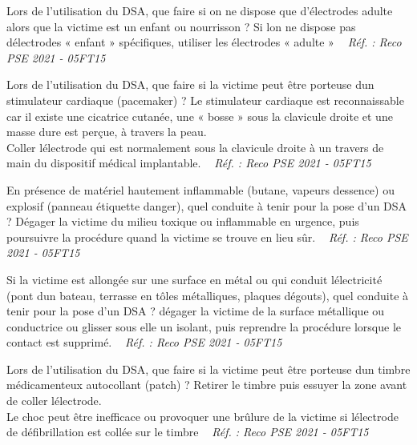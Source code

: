 \documentclass[grid,avery5371,landscape]{flashcards}
\makeatletter
\newcounter{nocarte}
\newcommand{\categ}[1]{%
  \def\@categ{#1}%
  \setcounter{nocarte}{0}%
}
\newcommand{\source}[1]{%
  \medskip
  \itshape%
   ~ \hfill Réf. : #1}
\makeatother
\begin{document}
\color[HTML]{003273}
\categ{PSE}
\begin{flashcard}[CAT]{
 Lors de l'utilisation du DSA, que faire si on ne dispose que d'électrodes adulte alors que la victime est un enfant ou nourrisson ?   }
  Si lon ne dispose pas délectrodes « enfant » spécifiques, utiliser les électrodes « adulte »
  \source{Reco PSE 2021 - 05FT15}
\end{flashcard}


\color[HTML]{003273}
\categ{PSE}
\begin{flashcard}[CAT]{
 Lors de l'utilisation du DSA, que faire si la victime peut être porteuse dun stimulateur cardiaque (pacemaker) ?   }
  Le stimulateur cardiaque est reconnaissable car il existe une cicatrice cutanée, une « bosse » sous la clavicule droite et une masse dure est perçue, à travers la peau. \\ Coller lélectrode qui est normalement sous la clavicule droite à un travers de main du dispositif médical implantable.
  \source{Reco PSE 2021 - 05FT15}
\end{flashcard}


\color[HTML]{003273}
\categ{PSE}
\begin{flashcard}[CAT]{
 En présence de matériel hautement inflammable (butane, vapeurs dessence) ou explosif (panneau étiquette danger), quel conduite à tenir pour la pose d'un DSA ?   }
  Dégager la victime du milieu toxique ou inflammable en urgence, puis poursuivre la procédure quand la victime se trouve en lieu sûr.
  \source{Reco PSE 2021 - 05FT15}
\end{flashcard}


\color[HTML]{003273}
\categ{PSE}
\begin{flashcard}[CAT]{
 Si la victime est allongée sur une surface en métal ou qui conduit lélectricité (pont dun bateau, terrasse en tôles métalliques, plaques dégouts), quel conduite à tenir pour la pose d'un DSA ?   }
  dégager la victime de la surface métallique ou conductrice ou glisser sous elle un isolant, puis reprendre la procédure lorsque le contact est supprimé.
  \source{Reco PSE 2021 - 05FT15}
\end{flashcard}


\color[HTML]{003273}
\categ{PSE}
\begin{flashcard}[CAT]{
 Lors de l'utilisation du DSA, que faire si la victime peut être porteuse dun timbre médicamenteux autocollant (patch) ?   }
  Retirer le timbre puis essuyer la zone avant de coller lélectrode. \\ Le choc peut être inefficace ou provoquer une brûlure de la victime si lélectrode de défibrillation est collée sur le timbre
  \source{Reco PSE 2021 - 05FT15}
\end{flashcard}
\end{document}
